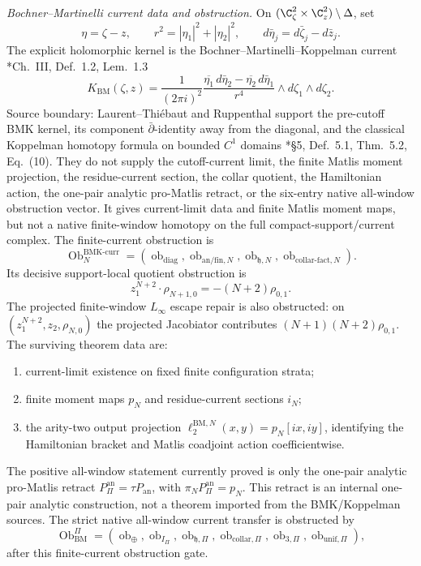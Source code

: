 \begin{stmt}
  \emph{Bochner--Martinelli current data and obstruction.} On
  \((\C^2_\zeta\times\C^2_z)\setminus\Delta\), set
  \[
    \eta=\zeta-z,\qquad
    r^2=|\eta_1|^2+|\eta_2|^2,\qquad
    d\bar\eta_j=d\bar\zeta_j-d\bar z_j .
  \]
  The explicit holomorphic kernel is the Bochner--Martinelli--Koppelman
  current
  \cite{laurent-thiebaut-bmk}*{Ch.~III, Def.~1.2, Lem.~1.3}
  \[
    K_{\mathrm{BM}}(\zeta,z)
    =
    \frac{1}{(2\pi i)^2}
    \frac{
      \overline{\eta_1}\,d\bar\eta_2
      -
      \overline{\eta_2}\,d\bar\eta_1
    }{r^4}
    \wedge d\zeta_1\wedge d\zeta_2 .
  \]
  Source boundary: Laurent--Thi\'ebaut and Ruppenthal support the
  pre-cutoff BMK kernel, its component \(\bar\partial\)-identity away
  from the diagonal, and the classical Koppelman homotopy formula on
  bounded \(C^1\) domains
  \cite{ruppenthal-bmk}*{\S5, Def.~5.1, Thm.~5.2, Eq.~(10)}.  They do
  not supply the cutoff-current limit, the finite Matlis moment
  projection, the residue-current section, the collar quotient, the
  Hamiltonian action, the one-pair analytic pro-Matlis retract, or the
  six-entry native all-window obstruction vector.
  It gives current-limit data and finite Matlis moment maps, but not a
  native finite-window homotopy on the full compact-support/current
  complex.  The finite-current obstruction is
  \[
    \operatorname{Ob}^{\mathrm{BMK\mbox{-}curr}}_N
    =
    (\operatorname{ob}_{\mathrm{diag}},
     \operatorname{ob}_{\mathrm{an}/\mathrm{fin},N},
     \operatorname{ob}_{\mathfrak h,N},
     \operatorname{ob}_{\mathrm{collar\mbox{-}fact},N}).
  \]
  Its decisive support-local quotient obstruction is
  \[
    z_1^{N+2}\cdot\rho_{N+1,0}=-(N+2)\rho_{0,1}.
  \]
  The projected finite-window \(L_\infty\) escape repair is also
  obstructed: on \((z_1^{N+2},z_2,\rho_{N,0})\) the projected Jacobiator
  contributes \((N+1)(N+2)\rho_{0,1}\).  The surviving theorem data are:
  \begin{enumerate}[label=(\arabic*)]
    \item current-limit existence on fixed finite configuration strata;
    \item finite moment maps \(p_N\) and residue-current sections \(i_N\);
    \item the arity-two output projection
      \(\ell_2^{\mathrm{BM},N}(x,y)=p_N[ix,iy]\), identifying the
      Hamiltonian bracket and Matlis coadjoint action coefficientwise.
  \end{enumerate}
  The positive all-window statement currently proved is only the
  one-pair analytic pro-Matlis retract
  \(P_{\Pi}^{\mathrm{an}}=\tau P_{\mathrm{an}}\), with
  \(\pi_NP_{\Pi}^{\mathrm{an}}=p_N\).  This retract is an internal
  one-pair analytic construction, not a theorem imported from the
  BMK/Koppelman sources.  The strict native all-window current transfer
  is obstructed by
  \[
    \operatorname{Ob}^{\Pi}_{\mathrm{BM}}
    =
    (\operatorname{ob}_{\oplus},\operatorname{ob}_{I_\Pi},
     \operatorname{ob}_{\mathfrak h,\Pi},
     \operatorname{ob}_{\mathrm{collar},\Pi},
     \operatorname{ob}_{3,\Pi},
     \operatorname{ob}_{\mathrm{unif},\Pi}),
  \]
  after this finite-current obstruction gate.


\end{stmt}
